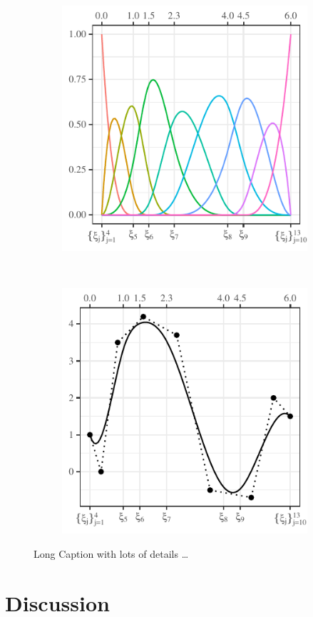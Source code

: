 \lipsum

\begin{figure}
\centering
  \begin{subfigure}[t]{0.48\linewidth}
  \includegraphics[width=\linewidth]{figures/a}
  \caption{\label{fig:graphic_a}}
  \end{subfigure}
  ~
  \begin{subfigure}[t]{0.48\linewidth}
  \includegraphics[width=\linewidth]{figures/b}
  \caption{\label{fig:graphic_b}}
  \end{subfigure}
  \caption[Short Caption for List of Figures]{Long Caption with lots of details
  \ldots \label{fig:graphic}}
\end{figure}

\lipsum

\section{Discussion}
\lipsum[4]

